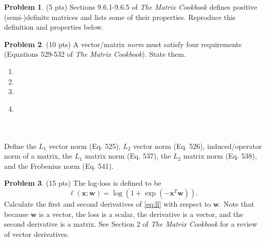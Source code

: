\documentclass[10pt]{article}
\theoremstyle{definition}
\newtheorem{problem}{Problem}
\newcommand{\trans}[1]{{#1}^{T}}
\newcommand{\loss}{\ell}
\newcommand{\w}{\mathbf w}
\newcommand{\x}{\mathbf x}
\begin{document}
\newpage
\begin{problem}
    (5 pts)
    Sections 9.6.1-9.6.5 of \emph{The Matrix Cookbook} defines positive (semi-)definite matrices and lists some of their properties.
    Reproduce this definition and properties below.
\end{problem}

\newpage
\begin{problem}
    (10 pts)
    A vector/matrix \emph{norm} must satisfy four requirements 
    (Equations 529-532 of \emph{The Matrix Cookbook}).
    State them.
    \begin{enumerate}
        \setlength\itemsep{0.5in}
        \item
        \item
        \item
        \item ~
            \\
            \\
            \\
    \end{enumerate}
    Define the $L_1$ vector norm (Eq. 525), $L_2$ vector norm (Eq. 526), induced/operator norm of a matrix, the $L_1$ matrix norm (Eq. 537), the $L_2$ matrix norm (Eq. 538), and the Frobenius norm (Eq. 541).
\end{problem}

\newpage
\begin{problem}
    (15 pts)
    The log-loss is defined to be
    \begin{equation}
        \label{eq:ll}
        \loss(\x;\w) = \log(1+\exp(-\trans\x\w)) 
        .
    \end{equation}
    Calculate the first and second derivatives of \eqref{eq:ll} with respect to $\w$.
    Note that because $\w$ is a vector, the loss is a scalar, the derivative is a vector, and the second derivative is a matrix.
    See Section 2 of \emph{The Matrix Cookbook} for a review of vector derivatives.
\end{problem}
\end{document}
